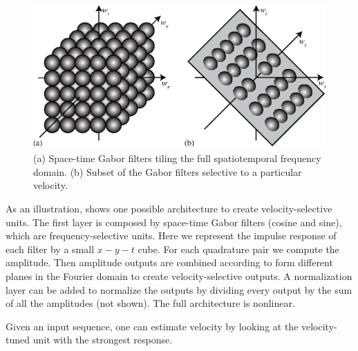 \begin{figure}[t]
	\centerline{
		\includegraphics[width=1\linewidth]{figures/temporal_filters/gabor_spacetime_tiles.eps}
	}
	\caption{(a) Space-time Gabor filters tiling the full spatiotemporal frequency domain. (b) Subset of the Gabor filters selective to a particular velocity.}
	\label{fig:spacetimetiles2}
\end{figure}


As an illustration, \fig{\ref{fig:MT_velocity_tuned}} shows one possible architecture to create velocity-selective units.
The first layer is composed by space-time Gabor filters (cosine and sine), which are frequency-selective units. Here we represent the impulse response of each filter by a small $x-y-t$ cube. For each quadrature pair we compute the amplitude. Then amplitude outputs are combined according to form different planes in the Fourier domain to create velocity-selective outputs. A normalization layer can be added to normalize the outputs by dividing every output by the sum of all the amplitudes (not shown). The full architecture is nonlinear.


Given an input sequence, one can estimate velocity by looking at the velocity-tuned unit with the strongest response.

